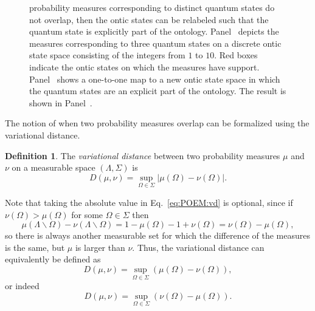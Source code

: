 \documentclass[DIV=calc,paper=a4,fontsize=11pt,twocolumn]{scrartcl} %
\theoremstyle{definition}
\newtheorem{definition}{Definition}[section]
\theoremstyle{plain}
\begin{document}
\begin{figure}[t!]
{{probability measures corresponding to distinct quantum states do
not overlap, then the ontic states can be relabeled such that the
quantum state is explicitly part of the ontology.
Panel~\protect{} depicts the measures
corresponding to three quantum states on a discrete ontic state
space consisting of the integers from $1$ to $10$.  Red boxes
indicate the ontic states on which the measures have support.
Panel~\protect{} shows a one-to-one
map to a new ontic state space in which the quantum states are an
explicit part of the ontology.  The result is shown in
Panel~\protect{}.}}
\end{figure}

The notion of when two probability measures overlap can be formalized
using the variational distance.
\begin{definition}
\label{def:POEM:vd}
The \emph{variational distance} between two probability measures
$\mu$ and $\nu$ on a measurable space $(\Lambda, \Sigma)$ is
\begin{equation}
\label{eq:POEM:vd}
D(\mu,\nu) = \sup_{\Omega \in \Sigma} \left | \mu(\Omega) -
\nu(\Omega) \right |.
\end{equation}
\end{definition}

Note that taking the absolute value in Eq.~\eqref{eq:POEM:vd} is
optional, since if $\nu(\Omega) > \mu(\Omega)$ for some $\Omega \in
\Sigma$ then
\begin{equation}
\mu(\Lambda \backslash \Omega) - \nu(\Lambda \backslash \Omega) =
1 - \mu(\Omega) - 1 + \nu(\Omega) = \nu(\Omega) - \mu(\Omega),
\end{equation}
so there is always another measurable set for which the difference of
the measures is the same, but $\mu$ is larger than $\nu$.  Thus, the
variational distance can equivalently be defined as
\begin{equation}
D(\mu,\nu) = \sup_{\Omega \in \Sigma} \left ( \mu(\Omega) -
\nu(\Omega) \right ),
\end{equation}
or indeed
\begin{equation}
D(\mu,\nu) = \sup_{\Omega \in \Sigma} \left ( \nu(\Omega) -
\mu(\Omega) \right ).
\end{equation}
\end{document}
